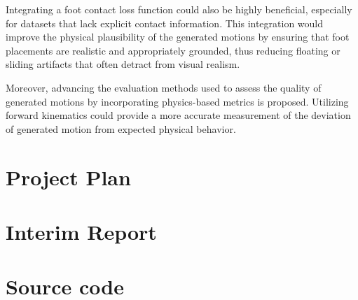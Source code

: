 \documentclass[a4paper, 12pt]{report}
\begin{document}
Integrating a foot contact loss function \cite{tevet_human_2022} could also be highly beneficial, especially for datasets that lack explicit contact information. This integration would improve the physical plausibility of the generated motions by ensuring that foot placements are realistic and appropriately grounded, thus reducing floating or sliding artifacts that often detract from visual realism.

Moreover, advancing the evaluation methods used to assess the quality of generated motions by incorporating physics-based metrics is proposed. Utilizing forward kinematics could provide a more accurate measurement of the deviation of generated motion from expected physical behavior. 

\appendix

\printbibliography

\chapter{Project Plan}


\chapter{Interim Report}


\chapter{Source code}







\end{document}
